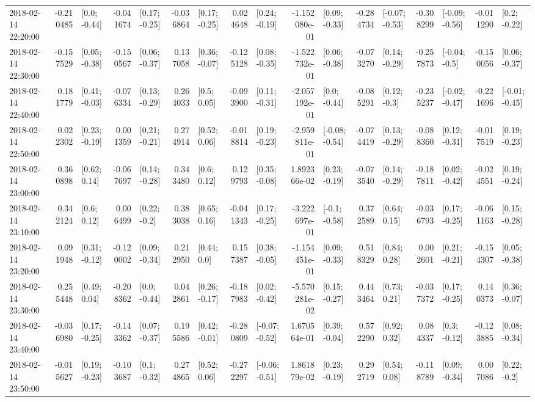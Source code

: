 \begin{tabular}{lrlrlrlrlrlrlrlrl}
2018-02-14 22:20:00 & -0.210485 &    [0.0; -0.44] & -0.041674 &   [0.17; -0.25] & -0.036864 &   [0.17; -0.25] &  0.024648 &   [0.24; -0.19] & -1.152080e-01 &   [0.09; -0.33] & -0.284734 &  [-0.07; -0.53] & -0.308299 &  [-0.09; -0.56] & -0.011290 &    [0.2; -0.22] \\
2018-02-14 22:30:00 & -0.157529 &   [0.05; -0.38] & -0.150567 &   [0.06; -0.37] &  0.137058 &   [0.36; -0.07] & -0.125128 &   [0.08; -0.35] & -1.522732e-01 &   [0.06; -0.38] & -0.073270 &   [0.14; -0.29] & -0.257873 &   [-0.04; -0.5] & -0.150056 &   [0.06; -0.37] \\
2018-02-14 22:40:00 &  0.181779 &   [0.41; -0.03] & -0.076334 &   [0.13; -0.29] &  0.264033 &     [0.5; 0.05] & -0.093900 &   [0.11; -0.31] & -2.057192e-01 &    [0.0; -0.44] & -0.085291 &    [0.12; -0.3] & -0.235237 &  [-0.02; -0.47] & -0.221696 &  [-0.01; -0.45] \\
2018-02-14 22:50:00 &  0.022302 &   [0.23; -0.19] &  0.001359 &   [0.21; -0.21] &  0.274914 &    [0.52; 0.06] & -0.018814 &   [0.19; -0.23] & -2.959811e-01 &  [-0.08; -0.54] & -0.074419 &   [0.13; -0.29] & -0.088360 &   [0.12; -0.31] & -0.017519 &   [0.19; -0.23] \\
2018-02-14 23:00:00 &  0.360898 &    [0.62; 0.14] & -0.067697 &   [0.14; -0.28] &  0.343480 &     [0.6; 0.12] &  0.129793 &   [0.35; -0.08] &  1.892366e-02 &   [0.23; -0.19] & -0.073540 &   [0.14; -0.29] & -0.187811 &   [0.02; -0.42] & -0.024551 &   [0.19; -0.24] \\
2018-02-14 23:10:00 &  0.342124 &     [0.6; 0.12] &  0.006499 &    [0.22; -0.2] &  0.383038 &    [0.65; 0.16] & -0.041343 &   [0.17; -0.25] & -3.222697e-01 &   [-0.1; -0.58] &  0.372589 &    [0.64; 0.15] & -0.036793 &   [0.17; -0.25] & -0.061163 &   [0.15; -0.28] \\
2018-02-14 23:20:00 &  0.091948 &   [0.31; -0.12] & -0.120002 &   [0.09; -0.34] &  0.212950 &     [0.44; 0.0] &  0.157387 &   [0.38; -0.05] & -1.154451e-01 &   [0.09; -0.33] &  0.518329 &    [0.84; 0.28] &  0.002601 &   [0.21; -0.21] & -0.154307 &   [0.05; -0.38] \\
2018-02-14 23:30:00 &  0.255448 &    [0.49; 0.04] & -0.208362 &    [0.0; -0.44] &  0.042861 &   [0.26; -0.17] & -0.187983 &   [0.02; -0.42] & -5.570281e-02 &   [0.15; -0.27] &  0.443464 &    [0.73; 0.21] & -0.037372 &   [0.17; -0.25] &  0.140373 &   [0.36; -0.07] \\
2018-02-14 23:40:00 & -0.036980 &   [0.17; -0.25] & -0.143362 &   [0.07; -0.37] &  0.195586 &   [0.42; -0.01] & -0.280809 &  [-0.07; -0.52] &  1.670564e-01 &   [0.39; -0.04] &  0.572290 &    [0.92; 0.32] &  0.084337 &    [0.3; -0.12] & -0.123885 &   [0.08; -0.34] \\
2018-02-14 23:50:00 & -0.015627 &   [0.19; -0.23] & -0.103687 &    [0.1; -0.32] &  0.274865 &    [0.52; 0.06] & -0.272297 &  [-0.06; -0.51] &  1.861879e-02 &   [0.23; -0.19] &  0.292719 &    [0.54; 0.08] & -0.118789 &   [0.09; -0.34] &  0.007086 &    [0.22; -0.2] \\
\bottomrule
\end{tabular}
